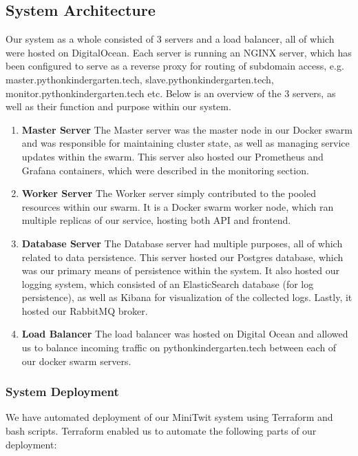   \subsection{System Architecture}
  Our system as a whole consisted of 3 servers and a load balancer, all of which were hosted on DigitalOcean.
  Each server is running an NGINX server, which has been configured to serve as a reverse proxy for routing of subdomain access, e.g. master.pythonkindergarten.tech, slave.pythonkindergarten.tech, monitor.pythonkindergarten.tech etc.
  \newline
  Below is an overview of the 3 servers, as well as their function and purpose within our system.\newline
  
  \begin{enumerate}
    \item \textbf{Master Server}\newline
    The Master server was the master node in our Docker swarm and was responsible for maintaining cluster state, as well as managing service updates within the swarm.
    This server also hosted our Prometheus and Grafana containers, which were described in the monitoring section.
    \item \textbf{Worker Server}\newline
    The Worker server simply contributed to the pooled resources within our swarm. 
    It is a Docker swarm worker node, which ran multiple replicas of our service, hosting both API and frontend.

    \item \textbf{Database Server}\newline
    The Database server had multiple purposes, all of which related to data persistence.
    This server hosted our Postgres database, which was our primary means of persistence within the system. 
    \newline
    It also hosted our logging system, which consisted of an ElasticSearch database (for log persistence), as well as Kibana for visualization of the collected logs.
    \newline
    Lastly, it hosted our RabbitMQ broker.
    \item \textbf{Load Balancer}\newline
    The load balancer was hosted on Digital Ocean and allowed us to balance incoming traffic on pythonkindergarten.tech between each of our docker swarm servers.
  \end{enumerate}
  \subsubsection{System Deployment}
  We have automated deployment of our MiniTwit system using Terraform and bash scripts.
  Terraform enabled us to automate the following parts of our deployment:\newline

